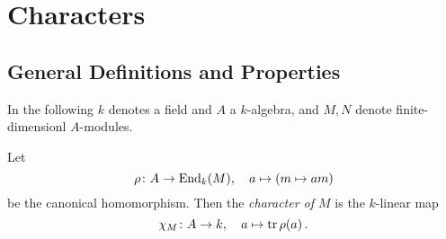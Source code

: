\section{Characters}





\subsection{General Definitions and Properties}


\begin{conventions}
  In the following $k$ denotes a field and $A$ a $k$-algebra, and $M, N$ denote finite-dimensionl $A$-modules.
\end{conventions}


\begin{definition}
  Let
  \[
            \rho
    \colon  A
    \to     \operatorname{End}_k(M),
    \quad   a
    \mapsto (m \mapsto am)
  \]
  be the canonical homomorphism.
  Then the \emph{character of $M$} is the $k$-linear map
  \[
            \chi_M
    \colon  A
    \to     k,
    \quad   a
    \mapsto \operatorname{tr} \rho(a) \,.
  \]
\end{definition}


